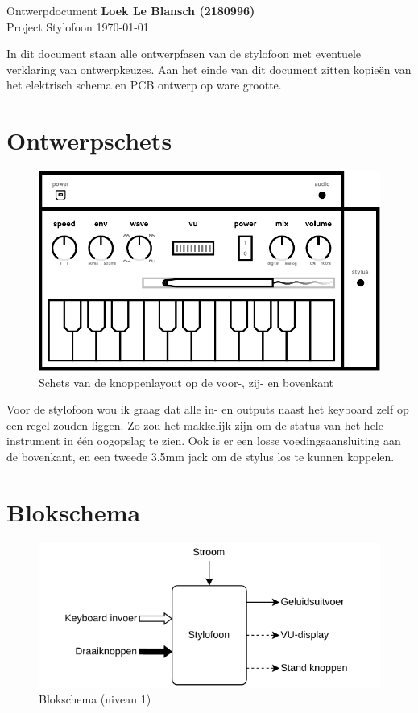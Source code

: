 \documentclass[12pt, a4paper, dutch]{article}
\begin{document}
Ontwerpdocument \hfill \textbf{Loek Le Blansch (2180996)}\\
Project Stylofoon \hfill \today
\medskip

In dit document staan alle ontwerpfasen van de stylofoon met eventuele verklaring van
ontwerpkeuzes. Aan het einde van dit document zitten kopieën van het elektrisch
schema en PCB ontwerp op ware grootte.

\section{Ontwerpschets}

\begin{figure}[H]
	\centering
	\includegraphics{figs/case-layout-sketch.pdf}
	\caption{Schets van de knoppenlayout op de voor-, zij- en bovenkant}
\end{figure}

Voor de stylofoon wou ik graag dat alle in- en outputs naast het keyboard zelf op een
regel zouden liggen. Zo zou het makkelijk zijn om de status van het hele instrument
in \'e\'en oogopslag te zien. Ook is er een losse voedingsaansluiting aan de
bovenkant, en een tweede 3.5mm jack om de stylus los te kunnen koppelen.

\newpage
\section{Blokschema}

\begin{figure}[H]
	\centering
	\includegraphics{figs/stylofoon blokschema-top-level.pdf}
	\caption{Blokschema (niveau 1)}
\end{figure}
\end{document}
